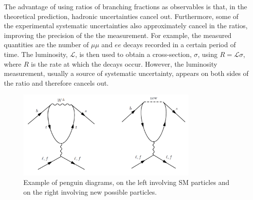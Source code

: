 
The advantage of using ratios of branching fractions as observables is that, in the theoretical prediction, hadronic 
uncertainties cancel out. Furthermore, some of the experimental systematic uncertainties also approximately cancel in 
the ratios, improving the precision of the the measurement. For example, the measured quantities are the number of 
$\mu\mu$ and $ee$ decays recorded in a certain period of time. The luminosity, $\mathcal{L}$, is then used to obtain a
cross-section, $\sigma$, using $R = \mathcal{L}\sigma$, where $R$ is the rate at which the decays occur. 
However, the luminosity measurement, usually a source of systematic uncertainty, appears on both
sides of the ratio and therefore cancels out.

\begin{figure}[h]
\centering \includegraphics[width=0.8\textwidth]{RKst/figs/penguins.png}
\caption{Example of penguin diagrams, on the left involving SM particles and on the right 
involving new possible particles.}
\label{fig:NPpenguins}
\end{figure}

